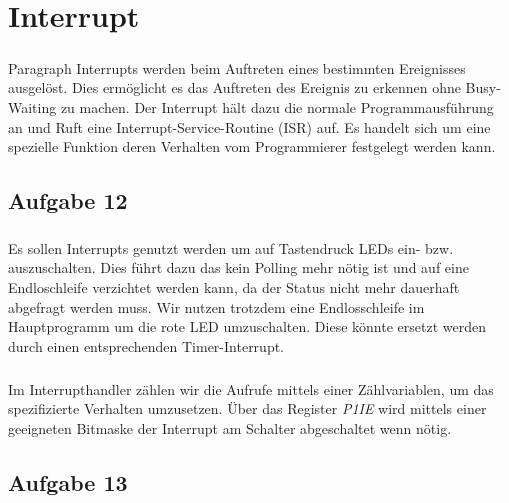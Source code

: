 \chapter{Interrupt}

\paragraph*{}
Paragraph Interrupts werden beim Auftreten eines bestimmten Ereignisses ausgelöst. Dies ermöglicht es das Auftreten des Ereignis zu erkennen ohne Busy-Waiting zu machen. Der Interrupt hält dazu die normale Programmausführung an und Ruft eine Interrupt-Service-Routine (ISR) auf. Es handelt sich um eine spezielle Funktion deren Verhalten vom Programmierer festgelegt werden kann. 


\section*{Aufgabe 12}

\paragraph*{}
Es sollen Interrupts genutzt werden um auf Tastendruck LEDs ein- bzw. auszuschalten. Dies führt dazu das kein Polling mehr nötig ist und auf eine Endloschleife verzichtet werden kann, da der Status nicht mehr dauerhaft abgefragt werden muss. Wir nutzen trotzdem eine Endlosschleife im Hauptprogramm um die rote LED umzuschalten. Diese könnte ersetzt werden durch einen entsprechenden Timer-Interrupt. \\



\paragraph*{}
Im Interrupthandler zählen wir die Aufrufe mittels einer Zählvariablen, um das spezifizierte Verhalten umzusetzen. Über das Register {\em P1IE} wird mittels einer geeigneten Bitmaske der Interrupt am Schalter abgeschaltet wenn nötig. \\ 



\section*{Aufgabe 13}

